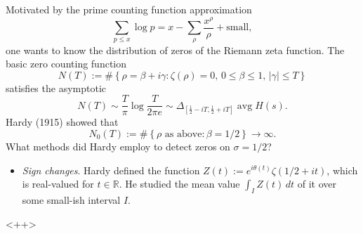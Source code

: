 \documentclass[reqno]{amsart} 
\begin{document}
Motivated by the prime counting function approximation
\begin{equation*}
  \sum_{p \leq x} \log p = x - \sum_\rho \frac{x^\rho}{\rho} + \mathrm{small},
\end{equation*}
one wants to know the distribution of zeros of the Riemann zeta function.  The basic zero counting function
\begin{equation*}
  N(T) := \# \left\{ \rho = \beta + i \gamma : \zeta(\rho) = 0, \, 0 \leq \beta \leq 1, \, \lvert \gamma \rvert \leq T \right\}
\end{equation*}
satisfies the asymptotic
\begin{equation*}
  N(T) \sim \frac{T}{\pi} \log \frac{T}{2 \pi e}
  \sim \Delta_{[\frac{1}{2} - i T, \frac{1}{2} + i T]} \operatorname{avg} H(s).
\end{equation*}
Hardy (1915) showed that
\begin{equation*}
  N_0(T) := \# \left\{ \rho \text{ as above} : \beta = 1/2 \right\}
  \rightarrow \infty.
\end{equation*}
What methods did Hardy employ to detect zeros on $\sigma = 1/2$?
\begin{itemize}
\item \emph{Sign changes}.  Hardy defined the function $Z(t) := e^{i \theta(t)} \zeta(1/2 + i t)$, which is real-valued for $t \in \mathbb{R}$.  He studied the mean value $\int_I Z(t) \, d t$ of it over some small-ish interval $I$.
\end{itemize}<++>


{} 
\end{document}

